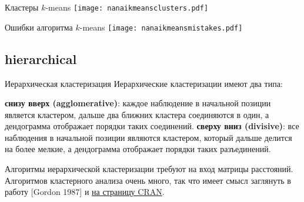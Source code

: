 \begin{frame}{Кластеры $k$-means}
\texttt{[image: nanaikmeansclusters.pdf]}
\end{frame}
\begin{frame}{Ошибки алгоритма $k$-means}
\texttt{[image: nanaikmeansmistakes.pdf]}
\end{frame}
\subsection{hierarchical}
\begin{frame}{Иерархическая кластеризация}
Иерархические кластеризации имеют два типа:
\begin{itemize}
\mytem \textbf{снизу вверх (agglomerative)}: каждое наблюдение в начальной позиции является кластером, дальше два ближних кластера соединяются в один, а дендограмма отображает порядки таких соединений.
\mytem \textbf{сверху вниз (divisive)}: все наблюдения в начальной позиции являются кластером, который дальше делится на более мелкие, а дендограмма отображает порядки таких разъединений.
\end{itemize}
Алгоритмы иерархической кластеризации требуют на вход матрицы расстояний. Алгоритмов кластерного анализа очень много, так что имеет смысл заглянуть в работу [Gordon 1987] и \alert{\href{http://cran.r-project.org/web/views/Cluster.html}{на страницу CRAN}}.
\end{frame}

